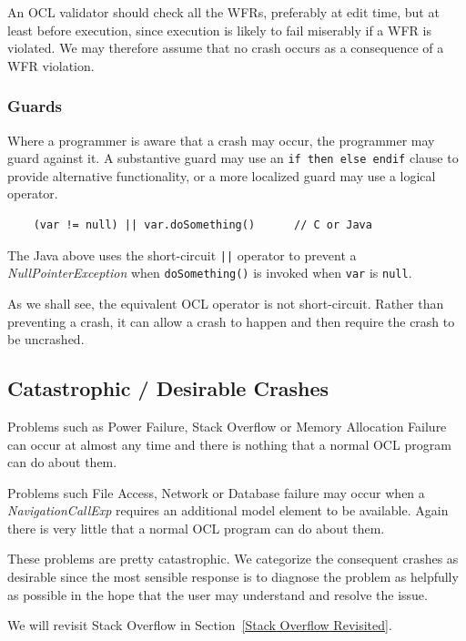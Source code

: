 \documentclass[
]{ceurart}
\begin{document}
An OCL validator should check all the WFRs, preferably at edit time, but at least before execution, since execution is likely to fail miserably if a WFR is violated. We may therefore assume that no crash occurs as a consequence of a WFR violation.

\subsubsection{Guards}\label{Guards} Where a programmer is aware that a crash may occur, the programmer may guard against it. A substantive guard may use an \verb|if then else endif| clause to provide alternative functionality, or a more localized guard may use a logical operator.

\begin{verbatim}
    (var != null) || var.doSomething()		// C or Java
\end{verbatim}

The Java above uses the short-circuit \verb&||& operator to prevent a \emph{NullPointerException} when \verb|doSomething()| is invoked when \verb|var| is \verb|null|.

As we shall see, the equivalent OCL operator is not short-circuit. Rather than preventing a crash, it can allow a crash to happen and then require the crash to be uncrashed.

\subsection{Catastrophic / Desirable Crashes}\label{Desirable Crashes}

Problems such as Power Failure, Stack Overflow or Memory Allocation Failure can occur at almost any time and there is nothing that a normal OCL program can do about them.

Problems such File Access, Network or Database failure may occur when a \emph{NavigationCallExp} requires an additional model element to be available. Again there is very little that a normal OCL program can do about them.

These problems are pretty catastrophic. We categorize the consequent crashes as desirable since the most sensible response is to diagnose the problem as helpfully as possible in the hope that the user may understand and resolve the issue.

We will revisit Stack Overflow in Section~\ref{Stack Overflow Revisited}.


\end{document}
